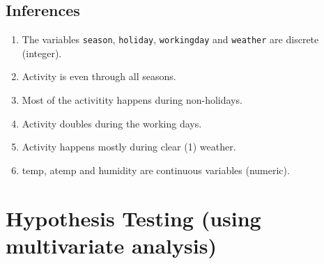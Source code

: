 \documentclass[]{book}
\newenvironment{Shaded}{\begin{snugshade}}{\end{snugshade}}
\newcommand{\CommentTok}[1]{\textcolor[rgb]{0.56,0.35,0.01}{\textit{#1}}}
\newcommand{\ControlFlowTok}[1]{\textcolor[rgb]{0.13,0.29,0.53}{\textbf{#1}}}
\newcommand{\KeywordTok}[1]{\textcolor[rgb]{0.13,0.29,0.53}{\textbf{#1}}}
\newcommand{\NormalTok}[1]{#1}
\newcommand{\OperatorTok}[1]{\textcolor[rgb]{0.81,0.36,0.00}{\textbf{#1}}}
\newcommand{\StringTok}[1]{\textcolor[rgb]{0.31,0.60,0.02}{#1}}
\providecommand{\tightlist}{%
  \setlength{\itemsep}{0pt}\setlength{\parskip}{0pt}}
\begin{document}
\begin{Shaded}
\end{Shaded}

\begin{Shaded}
\end{Shaded}

\hypertarget{inferences}{%
\subsection{Inferences}\label{inferences}}

\begin{enumerate}
\def\labelenumi{\arabic{enumi}.}
\tightlist
\item
  The variables \texttt{season}, \texttt{holiday}, \texttt{workingday} and \texttt{weather} are discrete (integer).
\item
  Activity is even through all seasons.
\item
  Most of the activitity happens during non-holidays.
\item
  Activity doubles during the working days.
\item
  Activity happens mostly during clear (1) weather.
\item
  temp, atemp and humidity are continuous variables (numeric).
\end{enumerate}

\hypertarget{hypothesis-testing-using-multivariate-analysis}{%
\section{Hypothesis Testing (using multivariate analysis)}\label{hypothesis-testing-using-multivariate-analysis}}
\end{document}
